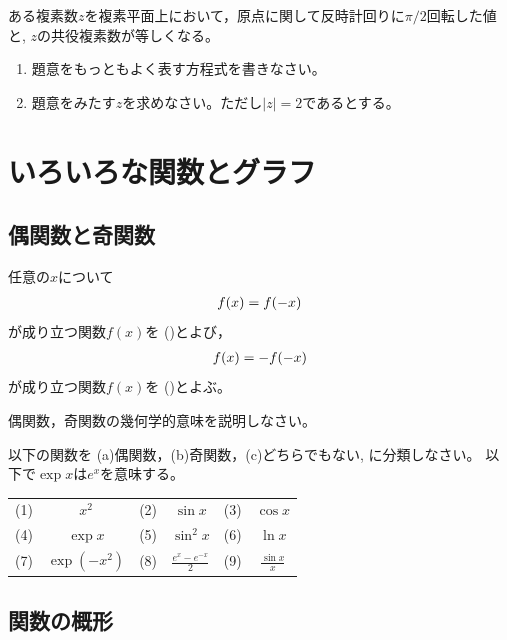 \documentclass[twocolumn,11pt]{jarticle}
\begin{document}
\nquestion
ある複素数$z$を複素平面上において，原点に関して反時計回りに$\pi/2$回転した値と, 
$z$の共役複素数が等しくなる。
\begin{enumerate}
\item 題意をもっともよく表す方程式を書きなさい。
\item 題意をみたす$z$を求めなさい。ただし$|z|=2$であるとする。
\end{enumerate}


\newpage

\section{いろいろな関数とグラフ}

\subsection{偶関数と奇関数}
任意の$x$について
\begin{align}
  f(x)=f(-x)\notag
\end{align}
が成り立つ関数$f(x)$を
()とよび，
\begin{align}
  f(x)=-f(-x)\notag
\end{align}
が成り立つ関数$f(x)$を
()とよぶ。

\nquestion
偶関数，奇関数の幾何学的意味を説明しなさい。

\nquestion
以下の関数を (a)偶関数，(b)奇関数，(c)どちらでもない, 
に分類しなさい。
以下で$\exp x$は$e^x$を意味する。

\begin{tabular}{rcrcrc}
(1) & $x^2$ & (2) & $\sin x$ & (3) & $\cos x$ \\
(4) & $\exp x$ & (5) & $\sin^2 x$ & (6) & $\ln x$  \\
(7) & $\exp(-x^2)$ & (8) & $\displaystyle\frac{e^x-e^{-x}}{2}$ & 
(9) & $\displaystyle\frac{\sin x}{x}$
\end{tabular}

\subsection{関数の概形\label{sec:graph}}
\end{document}

